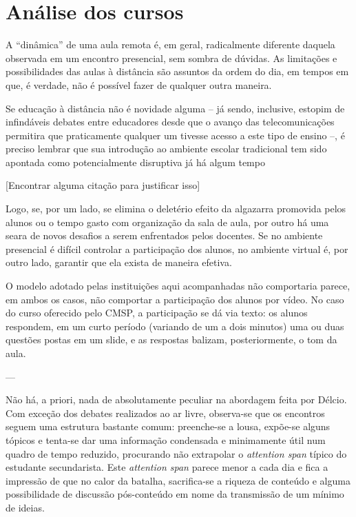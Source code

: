 \documentclass[12pt,a4paper]{article}
\begin{document}
	\newpage
		
	\section{Análise dos cursos}
	
	A “dinâmica” de uma aula remota é, em geral, radicalmente diferente 
	daquela observada em um encontro presencial, sem sombra de dúvidas. 
	As limitações e possibilidades das aulas à distância são assuntos da 
	ordem do dia, em tempos em que, é verdade, não é possível fazer de 
	qualquer outra maneira.

	Se educação à distância não é novidade alguma -- já sendo, inclusive, 
	estopim de infindáveis debates entre educadores desde que o avanço das 
	telecomunicações permitira que praticamente qualquer um tivesse acesso 
	a este tipo de ensino --, é preciso lembrar que sua introdução ao 
	ambiente escolar tradicional tem sido apontada como potencialmente 
	disruptiva já há algum tempo

	[Encontrar alguma citação para justificar isso]

	Logo, se, por um lado, se elimina o deletério efeito da algazarra 
	promovida pelos alunos ou o tempo gasto com organização da sala de 
	aula, por outro há uma seara de novos desafios a serem enfrentados 
	pelos docentes. Se no ambiente presencial é difícil controlar a 
	participação dos alunos, no ambiente virtual é, por outro lado, 
	garantir que ela exista de maneira efetiva. 

	O modelo adotado pelas instituições aqui acompanhadas não comportaria 
	parece, em ambos os casos, não comportar a participação dos alunos por 
	vídeo. No caso do curso oferecido pelo CMSP, a participação se dá via 
	texto: os alunos respondem, em um curto período (variando de um a dois 
	minutos) uma ou duas questões postas em um slide, e as respostas 
	balizam, posteriormente, o tom da aula. 
	


---


	Não há, a priori, nada de absolutamente peculiar na abordagem feita por 
	Délcio. Com exceção dos debates realizados ao ar livre, observa-se que 
	os encontros seguem uma estrutura bastante comum: preenche-se a lousa, 
	expõe-se alguns tópicos e tenta-se dar uma informação condensada e 
	minimamente útil num quadro de tempo reduzido, procurando não extrapolar 
	o \textit{attention span} típico do estudante secundarista. Este 
	\textit{attention span} parece menor a cada dia e fica a impressão de que 
	no calor da batalha, sacrifica-se a riqueza de conteúdo e alguma 
	possibilidade de discussão pós-conteúdo em nome da transmissão de um 
	mínimo de ideias. 
	
\end{document}
